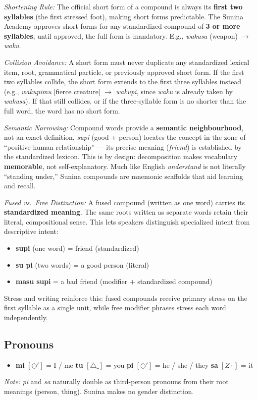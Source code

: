 \documentclass[12pt, a4paper]{article}
\begin{document}
\textit{Shortening Rule:} The official short form of a compound is always its \textbf{first two syllables} (the first stressed foot), making short forms predictable. The Sunina Academy approves short forms for any standardized compound of \textbf{3 or more syllables}; until approved, the full form is mandatory. E.g., \textit{wakusa} (weapon) $\rightarrow$ \textit{waku}.

\textit{Collision Avoidance:} A short form must never duplicate any standardized lexical item, root, grammatical particle, or previously approved short form. If the first two syllables collide, the short form extends to the first three syllables instead (e.g., \textit{wakupimu} [fierce creature] $\rightarrow$ \textit{wakupi}, since \textit{waku} is already taken by \textit{wakusa}). If that still collides, or if the three-syllable form is no shorter than the full word, the word has no short form.

\textit{Semantic Narrowing:} Compound words provide a \textbf{semantic neighbourhood}, not an exact definition. \textit{supi} (good + person) locates the concept in the zone of ``positive human relationship'' --- its precise meaning (\textit{friend}) is established by the standardized lexicon. This is by design: decomposition makes vocabulary \textbf{memorable}, not self-explanatory. Much like English \textit{understand} is not literally ``standing under,'' Sunina compounds are mnemonic scaffolds that aid learning and recall.

\textit{Fused vs.\ Free Distinction:} A fused compound (written as one word) carries its \textbf{standardized meaning}. The same roots written as separate words retain their literal, compositional sense. This lets speakers distinguish specialized intent from descriptive intent:
\begin{itemize}
    \item \textbf{supi} (one word) = friend (standardized)
    \item \textbf{su pi} (two words) = a good person (literal)
    \item \textbf{masu supi} = a bad friend (modifier + standardized compound)
\end{itemize}
Stress and writing reinforce this: fused compounds receive primary stress on the first syllable as a single unit, while free modifier phrases stress each word independently.

\subsection{Pronouns}
\begin{itemize}
    \item \textbf{mi} $[\ominus']$ = I / me \quad \textbf{tu} $[\triangle\_]$ = you \quad \textbf{pi} $[\bigcirc']$ = he / she / they \quad \textbf{sa} $[Z\cdot]$ = it
\end{itemize}
\textit{Note:} \textit{pi} and \textit{sa} naturally double as third-person pronouns from their root meanings (person, thing). Sunina makes no gender distinction.
\end{document}
